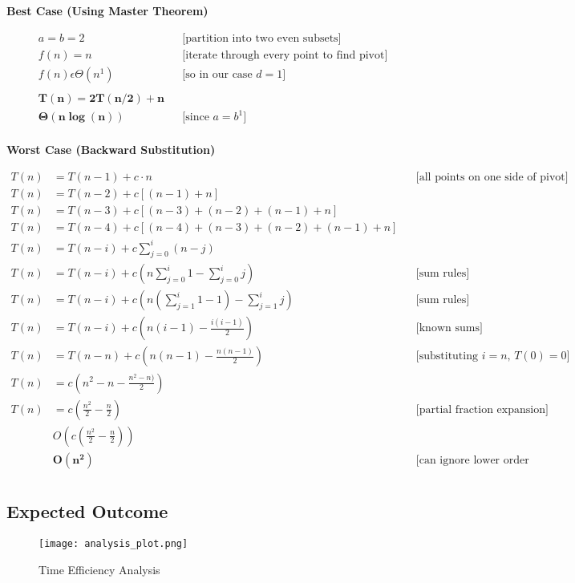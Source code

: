 \documentclass{article}
\begin{document}
{\textbf{Best Case (Using Master Theorem)}
\begin{center}
  \begin{align*}
    &a = b = 2 &&\text{[partition into two even subsets]} \\
    &f(n) = n &&\text{[iterate through every point to find pivot]} \\
    &f(n) \epsilon \Theta(n^1) &&\text{[so in our case $d=1$]} \\\\
    &\bm{T(n) = 2T(n/2) + n} \\
    &\bm{\Theta(n\log(n))} &&\text{[since $a=b^1$]} \\
  \end{align*}
\end{center}
\textbf{Worst Case (Backward Substitution)} 
\begin{center}
  \begin{align*}
    T(n) &= T(n-1) + c\cdot n &&\text{[all points on one side of pivot]} \\
    T(n) &= T(n-2) + c[(n-1) + n] \\
    T(n) &= T(n-3) + c[(n-3) + (n-2) + (n-1) + n] \\
    T(n) &= T(n-4) + c[(n-4) + (n-3) + (n-2) + (n-1) + n] \\
    T(n) &= T(n-i) + c\sum\limits_{j=0}^i (n-j) \\ 
    T(n) &= T(n-i) + c(n\sum\limits_{j=0}^i1 - \sum\limits_{j=0}^i j) &&\text{[sum rules]}\\ 
    T(n) &= T(n-i) + c(n(\sum\limits_{j=1}^i1 - 1)  - \sum\limits_{j=1}^i j) &&\text{[sum rules]}\\ 
    T(n) &= T(n-i) + c(n(i - 1)  - \frac{i(i-1)}{2}) &&\text{[known sums]}\\ 
    T(n) &= T(n-n) + c(n(n - 1)  - \frac{n(n-1)}{2}) &&\text{[substituting $i=n$, $T(0)=0$]}\\ 
    T(n) &= c(n^2 - n  - \frac{n^2-n)}{2}) \\ 
    T(n) &= c(\frac{n^2}{2} - \frac{n}{2}) &&\text{[partial fraction expansion]}\\ 
         &O(c(\frac{n^2}{2} - \frac{n}{2})) \\
         &\bm{O(n^2)} &&\text{[can ignore lower order terms/constants]} \\
  \end{align*}
\end{center}

  \subsection{Expected Outcome}
  \begin{figure}[H]
    \texttt{[image: analysis\_plot.png]}
    \caption{Time Efficiency Analysis}
    \label{fig:time_plot}
  \end{figure} 
}
\end{document}
